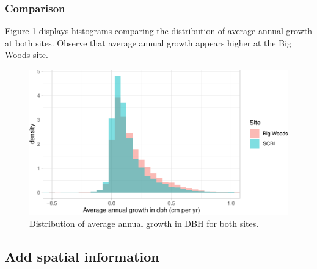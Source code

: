 \documentclass[12pt]{article}
\newenvironment{Shaded}{\begin{snugshade}}{\end{snugshade}}
\newcommand{\CommentTok}[1]{\textcolor[rgb]{0.56,0.35,0.01}{\textit{#1}}}
\newcommand{\DataTypeTok}[1]{\textcolor[rgb]{0.13,0.29,0.53}{#1}}
\newcommand{\DecValTok}[1]{\textcolor[rgb]{0.00,0.00,0.81}{#1}}
\newcommand{\KeywordTok}[1]{\textcolor[rgb]{0.13,0.29,0.53}{\textbf{#1}}}
\newcommand{\NormalTok}[1]{#1}
\newcommand{\OperatorTok}[1]{\textcolor[rgb]{0.81,0.36,0.00}{\textbf{#1}}}
\newcommand{\StringTok}[1]{\textcolor[rgb]{0.31,0.60,0.02}{#1}}
\begin{document}
\begin{Shaded}
\end{Shaded}

\hypertarget{comparison}{%
\subsubsection{Comparison}\label{comparison}}

Figure \ref{fig:growth-histogram} displays histograms comparing the
distribution of average annual growth at both sites. Observe that
average annual growth appears higher at the Big Woods site.

\begin{figure}

{\centering \includegraphics[width=1\linewidth]{Figures/growth-histogram-1} 

}

\caption{Distribution of average annual growth in DBH for both sites.}\label{fig:growth-histogram}
\end{figure}

\hypertarget{spatial-information}{%
\subsection{Add spatial information}\label{spatial-information}}
\end{document}
